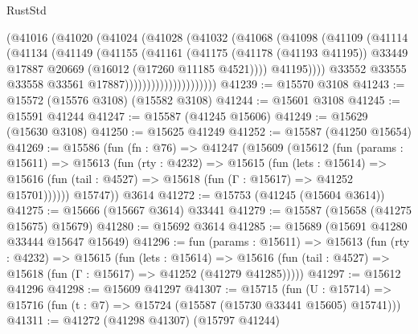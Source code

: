 \begin{lexlean}{RustStd}
\begin{coremodule}
                              (@41016
                                (@41020
                                  (@41024
                                    (@41028
                                      (@41032
                                        (@41068
                                          (@41098
                                            (@41109
                                              (@41114
                                                (@41134
                                                  (@41149
                                                    (@41155
                                                      (@41161
                                                        (@41175
                                                          (@41178 (@41193 @41195))
                                                          @33449
                                                          @17887
                                                          @20669
                                                          (@16012 (@17260 @11185 @4521))))
                                                      @41195))))
                                              @33552
                                              @33555
                                              @33558
                                              @33561
                                              @17887)))))))))))))))))))))
@41239 := @15570 @3108
@41243 := @15572 (@15576 @3108) (@15582 @3108)
@41244 := @15601 @3108
@41245 := @15591 @41244
@41247 := @15587 (@41245 @15606)
@41249 := @15629 (@15630 @3108)
@41250 := @15625 @41249
@41252 := @15587 (@41250 @15654)
@41269 := @15586
    (fun (fn : @76) =>
    @41247
      (@15609
        (@15612
          (fun (params : @15611) =>
          @15613
            (fun (rty : @4232) =>
            @15615
              (fun (lets : @15614) =>
              @15616 (fun (tail : @4527) => @15618 (fun (Γ : @15617) => @41252 @15701))))))
        @15747))
    @3614
@41272 := @15753 (@41245 (@15604 @3614))
@41275 := @15666 (@15667 @3614) @33441
@41279 := @15587 (@15658 (@41275 @15675) @15679)
@41280 := @15692 @3614
@41285 := @15689 (@15691 @41280 @33444 @15647 @15649)
@41296 := fun (params : @15611) =>
  @15613
    (fun (rty : @4232) =>
    @15615
      (fun (lets : @15614) =>
      @15616 (fun (tail : @4527) => @15618 (fun (Γ : @15617) => @41252 (@41279 @41285)))))
@41297 := @15612 @41296
@41298 := @15609 @41297
@41307 := @15715
    (fun (U : @15714) => @15716 (fun (t : @7) => @15724 (@15587 (@15730 @33441 @15605) @15741)))
@41311 := @41272 (@41298 @41307) (@15797 @41244)

\end{coremodule}
\end{lexlean}
